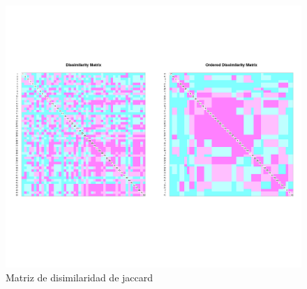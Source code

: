 \documentclass[11pt,]{article}
\begin{document}
\begin{figure}
\centering
\includegraphics{diss_jaccard.png}
\caption{\label{fig:diss_jaccard}Matriz de disimilaridad de jaccard}
\end{figure}
\end{document}
